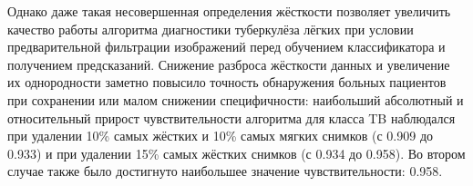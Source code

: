 Однако даже такая несовершенная  определения жёсткости позволяет увеличить качество работы алгоритма диагностики туберкулёза лёгких при условии предварительной фильтрации изображений перед обучением классификатора и получением предсказаний. Снижение разброса жёсткости данных и увеличение их однородности заметно повысило точность обнаружения больных пациентов при сохранении или малом снижении специфичности: наибольший абсолютный и относительный прирост чувствительности алгоритма для класса TB наблюдался при удалении 10\% самых жёстких и 10\% самых мягких снимков (с 0.909 до 0.933) и при удалении 15\% самых жёстких снимков (с 0.934 до 0.958). Во втором случае также было достигнуто наибольшее значение чувствительности: 0.958.


\FloatBarrier 
